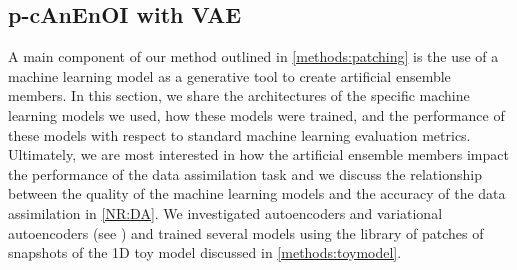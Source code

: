 \documentclass[final,3p]{elsarticle}
\theoremstyle{break}
\begin{document}
\subsection{p-cAnEnOI with VAE}\label{NR:vae}
A main component of our method outlined in \cref{methods:patching} is the use of a machine learning model as a generative tool to create artificial ensemble members.
In this section, we share the architectures of the specific machine learning models we used, how these models were trained, and the performance of these models with respect to standard machine learning evaluation metrics.
Ultimately, we are most interested in how the artificial ensemble members impact the performance of the data assimilation task and we discuss the relationship between the quality of the machine learning models and the accuracy of the data assimilation in \cref{NR:DA}.
We investigated autoencoders and variational autoencoders (see \cite{Kingma2019}) and trained several models using the library of patches of snapshots of the 1D toy model discussed in \cref{methods:toymodel}.\par

\end{document}
